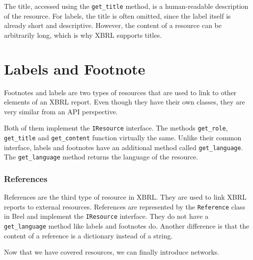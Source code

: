 The title, accessed using the \texttt{get\_title} method, is a human-readable description of the resource.
For labels, the title is often omitted, since the label itself is already short and descriptive.
However, the content of a resource can be arbitrarily long, which is why XBRL supports titles.

\section{Labels and Footnote}

Footnotes and labels are two types of resources that are used to link to other elements of an XBRL report.
Even though they have their own classes, they are very similar from an API perspective.

Both of them implement the \texttt{IResource} interface.
The methods \texttt{get\_role}, \texttt{get\_title} and \texttt{get\_content} function virtually the same.
Unlike their common interface, labels and footnotes have an additional method called \texttt{get\_language}.
The \texttt{get\_language} method returns the language of the resource.

\subsubsection{References}

References are the third type of resource in XBRL.
They are used to link XBRL reports to external resources.
References are represented by the \texttt{Reference} class in Brel and implement the \texttt{IResource} interface.
They do not have a \texttt{get\_language} method like labels and footnotes do.
Another difference is that the content of a reference is a dictionary instead of a string.

Now that we have covered resources, we can finally introduce networks.
